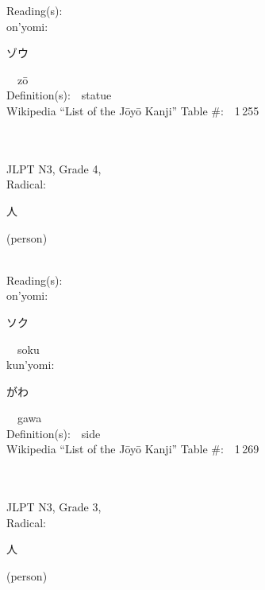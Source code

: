 \begin{multicols}{2}
Reading(s):\ \ \\
{\hspace*{1em}}on'yomi:\ \ \\
{\hspace*{2em}}{\begin{CJK}{UTF8}{min} ゾウ \end{CJK}}\ \ z\=o\ \ \\
Definition(s):\ \ statue \\
Wikipedia ``List of the J\=oy\=o Kanji'' Table \#:\ \ 1\,255 \\
\ \ \\
{\fontsize{34pt}{40pt}  }\ \ \\  %
{JLPT N3, Grade 4, \\Radical:\ \ {\begin{CJK}{UTF8}{min} 人 \end{CJK}} (person) } \\
Reading(s):\ \ \\
{\hspace*{1em}}on'yomi:\ \ \\
{\hspace*{2em}}{\begin{CJK}{UTF8}{min} ソク \end{CJK}}\ \ soku\ \ \\
{\hspace*{1em}}kun'yomi:\ \ \\
{\hspace*{2em}}{\begin{CJK}{UTF8}{min} がわ \end{CJK}}\ \ gawa\ \ \\
Definition(s):\ \ side \\
Wikipedia ``List of the J\=oy\=o Kanji'' Table \#:\ \ 1\,269 \\
\ \ \\
{\fontsize{34pt}{40pt}  }\ \ \\  %
{JLPT N3, Grade 3, \\Radical:\ \ {\begin{CJK}{UTF8}{min} 人 \end{CJK}} (person) } \\

\end{multicols}
